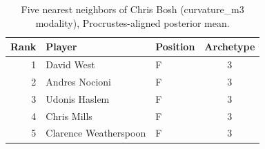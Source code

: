 \begin{table}[htbp]
  \centering\small
  \begin{tabular}{rllc}
    \toprule
    Rank & Player & Position & Archetype \\
    \midrule
    1 & David West & F & 3 \\
    2 & Andres Nocioni & F & 3 \\
    3 & Udonis Haslem & F & 3 \\
    4 & Chris Mills & F & 3 \\
    5 & Clarence Weatherspoon & F & 3 \\
    \bottomrule
  \end{tabular}
  \caption{Five nearest neighbors of Chris Bosh (curvature_m3 modality), Procrustes-aligned posterior mean.}
  \label{tab:Chris_Bosh_neighbors_curvature_m3}
\end{table}

